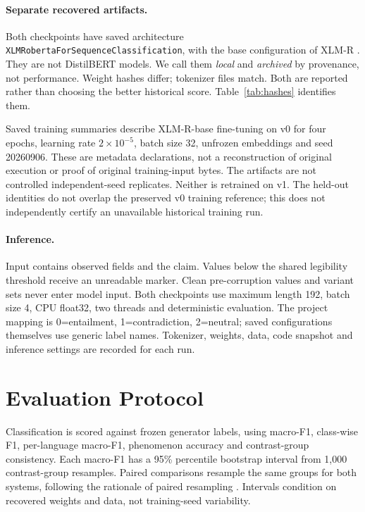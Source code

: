 \documentclass[11pt]{article}
\begin{document}
\paragraph{Separate recovered artifacts.}
Both checkpoints have saved architecture
\texttt{XLMRobertaForSequenceClassification}, with the base configuration of
XLM-R \citep{conneau2020xlmr}. They are not DistilBERT models. We call them
\emph{local} and \emph{archived} by provenance, not performance. Weight hashes
differ; tokenizer files match. Both are reported rather than choosing the
better historical score. Table~\ref{tab:hashes} identifies them.

Saved training summaries describe XLM-R-base fine-tuning on v0 for four epochs,
learning rate $2\times10^{-5}$, batch size 32, unfrozen embeddings and seed
20260906. These are metadata declarations, not a reconstruction of original
execution or proof of original training-input bytes. The artifacts are not
controlled independent-seed replicates. Neither is retrained on v1. The held-out
identities do not overlap the preserved v0 training reference; this does not
independently certify an unavailable historical training run.

\paragraph{Inference.}
Input contains observed fields and the claim. Values below the shared
legibility threshold receive an unreadable marker. Clean pre-corruption values
and variant sets never enter model input. Both checkpoints use maximum length
192, batch size 4, CPU float32, two threads and deterministic evaluation.
The project mapping is 0=entailment, 1=contradiction, 2=neutral; saved
configurations themselves use generic label names. Tokenizer, weights, data,
code snapshot and inference settings are recorded for each run.

\section{Evaluation Protocol}
Classification is scored against frozen generator labels, using macro-F1,
class-wise F1, per-language macro-F1, phenomenon accuracy and contrast-group
consistency. Each macro-F1 has a 95\% percentile bootstrap interval from 1,000
contrast-group resamples. Paired comparisons resample the same groups for both
systems, following the rationale of paired resampling \citep{koehn2004significance}.
Intervals condition on recovered weights and data, not training-seed variability.
\end{document}
